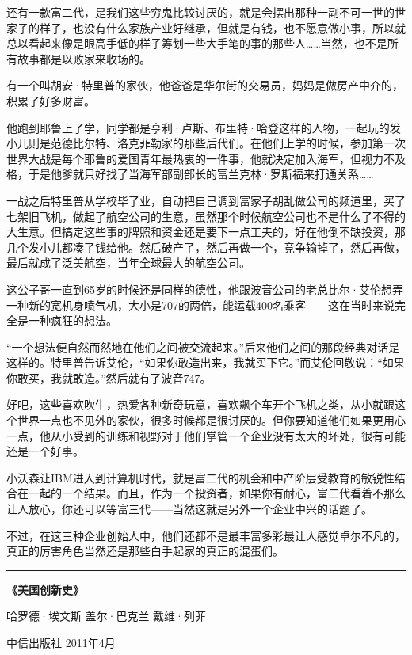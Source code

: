 还有一款富二代，是我们这些穷鬼比较讨厌的，就是会摆出那种一副不可一世的世家子的样子，也没有什么家族产业好继承，但就是有钱，也不愿意做小事，所以就总以看起来像是眼高手低的样子筹划一些大手笔的事的那些人\ldots{}\ldots{}当然，也不是所有故事都是以败家来收场的。

有一个叫胡安·特里普的家伙，他爸爸是华尔街的交易员，妈妈是做房产中介的，积累了好多财富。

他跑到耶鲁上了学，同学都是亨利·卢斯、布里特·哈登这样的人物，一起玩的发小儿则是范德比尔特、洛克菲勒家的那些后代们。在他们上学的时候，参加第一次世界大战是每个耶鲁的爱国青年最热衷的一件事，他就决定加入海军，但视力不及格，于是他爹就只好找了当海军部副部长的富兰克林·罗斯福来打通关系\ldots{}\ldots{}

一战之后特里普从学校毕了业，自动把自己调到富家子胡乱做公司的频道里，买了七架旧飞机，做起了航空公司的生意，虽然那个时候航空公司也不是什么了不得的大生意。但搞定这些事的牌照和资金还是要下一点工夫的，好在他倒不缺投资，那几个发小儿都凑了钱给他。然后破产了，然后再做一个，竞争输掉了，然后再做，最后就成了泛美航空，当年全球最大的航空公司。

这公子哥一直到65岁的时候还是同样的德性，他跟波音公司的老总比尔·艾伦想弄一种新的宽机身喷气机，大小是707的两倍，能运载400名乘客------这在当时来说完全是一种疯狂的想法。

``一个想法便自然而然地在他们之间被交流起来。''后来他们之间的那段经典对话是这样的。特里普告诉艾伦，``如果你敢造出来，我就买下它。''而艾伦回敬说：``如果你敢买，我就敢造。''然后就有了波音747。

好吧，这些喜欢吹牛，热爱各种新奇玩意，喜欢飙个车开个飞机之类，从小就跟这个世界一点也不见外的家伙，很多时候都是很讨厌的。但你要知道他们如果更用心一点，他从小受到的训练和视野对于他们掌管一个企业没有太大的坏处，很有可能还是一个好事。

小沃森让IBM进入到计算机时代，就是富二代的机会和中产阶层受教育的敏锐性结合在一起的一个结果。而且，作为一个投资者，如果你有耐心，富二代看着不那么让人放心，你还可以等富三代------当然这就是另外一个企业中兴的话题了。

不过，在这三种企业创始人中，他们还都不是最丰富多彩最让人感觉卓尔不凡的，真正的厉害角色当然还是那些白手起家的真正的混蛋们。

\begin{center}\rule{3in}{0.4pt}\end{center}

\textbf{《美国创新史》}

哈罗德·埃文斯 盖尔·巴克兰 戴维·列菲

中信出版社 2011年4月

